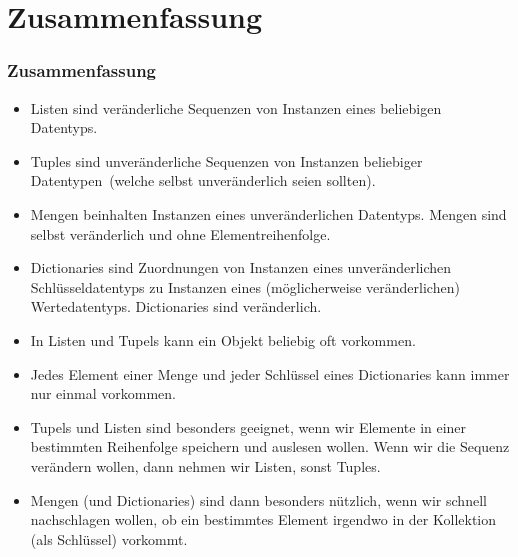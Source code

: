 \documentclass[aspectratio=169,mathserif,notheorems]{beamer}%
\begin{document}
\section{Zusammenfassung}%
%
\begin{frame}%
\frametitle{Zusammenfassung}%
\begin{itemize}%
%
%
\item<2-> Listen sind veränderliche Sequenzen von Instanzen eines beliebigen Datentyps.%
%
\item<3-> Tuples sind unveränderliche Sequenzen von Instanzen beliebiger Datentypen~(welche selbst unveränderlich seien sollten).%
%
\item<4-> Mengen beinhalten Instanzen eines unveränderlichen Datentyps. Mengen sind selbst veränderlich und ohne Elementreihenfolge.%
%
\item<5-> Dictionaries sind Zuordnungen von Instanzen eines unveränderlichen Schlüsseldatentyps zu Instanzen eines (möglicherweise veränderlichen) Wertedatentyps. Dictionaries sind veränderlich.%
%
\item<6-> In Listen und Tupels kann ein Objekt beliebig oft vorkommen.%
%
\item<7-> Jedes Element einer Menge und jeder Schlüssel eines Dictionaries kann immer nur einmal vorkommen.%
%
\item<8-> Tupels und Listen sind besonders geeignet, wenn wir Elemente in einer bestimmten Reihenfolge speichern und auslesen wollen. Wenn wir die Sequenz verändern wollen, dann nehmen wir Listen, sonst Tuples.%
%
\item<9-> Mengen (und Dictionaries) sind dann besonders nützlich, wenn wir schnell nachschlagen wollen, ob ein bestimmtes Element irgendwo in der Kollektion (als Schlüssel) vorkommt.%
\end{itemize}%
%
\end{frame}%
%
\end{document}
